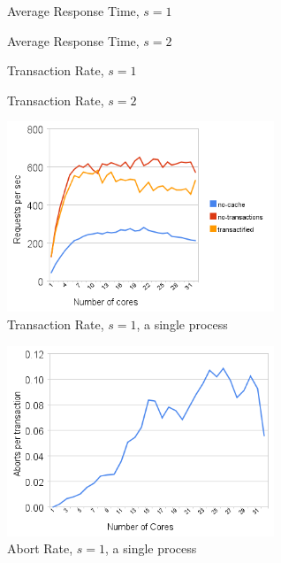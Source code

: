 \documentclass[preprint,natbib,11pt]{sigplanconf}
\begin{document}
\begin{figure}
 \begin{center}
 \end{center}
 \caption{Average Response Time, $s = 1$}
 \label{fig:response-time-1}
\end{figure}
\begin{figure}
 \begin{center}
 \end{center}
 \caption{Average Response Time, $s = 2$}
 \label{fig:response-time-2}
\end{figure}
\begin{figure}
 \begin{center}
 \end{center}
 \caption{Transaction Rate, $s = 1$}
 \label{fig:transaction-rate-1}
\end{figure}
\begin{figure}
 \begin{center}
 \end{center}
 \caption{Transaction Rate, $s = 2$}
 \label{fig:transaction-rate-2}
\end{figure}
\begin{figure}
 \begin{center}
  \includegraphics[width=8cm]{transaction-rate-single-process.png}
 \end{center}
 \caption{Transaction Rate, $s = 1$, a single process}
 \label{fig:one-process-transaction-rate}
\end{figure}
\begin{figure}
 \begin{center}
  \includegraphics[width=8cm]{abort-rate.png}
 \end{center}
 \caption{Abort Rate, $s = 1$, a single process}
 \label{fig:abort-rate}
\end{figure}
\end{document}
